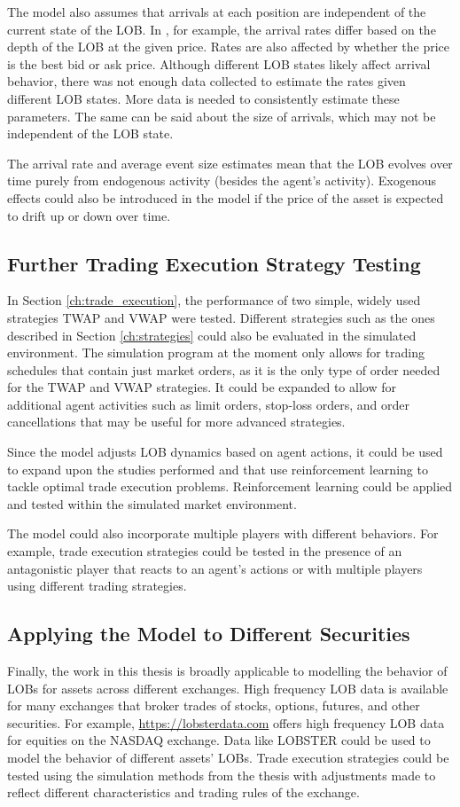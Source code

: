 The model also assumes that arrivals at each position are independent of the current state of the LOB. In \cite{A6}, for example, the arrival rates differ based on the depth of the LOB at the given price. Rates are also affected by whether the price is the best bid or ask price. Although different LOB states likely affect arrival behavior, there was not enough data collected to estimate the rates given different LOB states. More data is needed to consistently estimate these parameters. The same can be said about the size of arrivals, which may not be independent of the LOB state.

The arrival rate and average event size estimates mean that the LOB evolves over time purely from endogenous activity (besides the agent's activity). Exogenous effects could also be introduced in the model if the price of the asset is expected to drift up or down over time. 

\subsection{Further Trading Execution Strategy Testing}
In Section \ref{ch:trade_execution}, the performance of two simple, widely used strategies TWAP and VWAP were tested. Different strategies such as the ones described in Section \ref{ch:strategies} could also be evaluated in the simulated environment. The simulation program at the moment only allows for trading schedules that contain just market orders, as it is the only type of order needed for the TWAP and VWAP strategies. It could be expanded to allow for additional agent activities such as limit orders, stop-loss orders, and order cancellations that may be useful for more advanced strategies. 

Since the model adjusts LOB dynamics based on agent actions, it could be used to expand upon the studies performed \cite{A3} and \cite{A4} that use reinforcement learning to tackle optimal trade execution problems. Reinforcement learning could be applied and tested within the simulated market environment. 

The model could also incorporate multiple players with different behaviors. For example, trade execution strategies could be tested in the presence of an antagonistic player that reacts to an agent's actions or with multiple players using different trading strategies.

\subsection{Applying the Model to Different Securities}
Finally, the work in this thesis is broadly applicable to modelling the behavior of LOBs for assets across different exchanges. High frequency LOB data is available for many exchanges that broker trades of stocks, options, futures, and other securities. For example, \url{https://lobsterdata.com} offers high frequency LOB data for equities on the NASDAQ exchange. Data like LOBSTER could be used to model the behavior of different assets' LOBs. Trade execution strategies could be tested using the simulation methods from the thesis with adjustments made to reflect different characteristics and trading rules of the exchange.